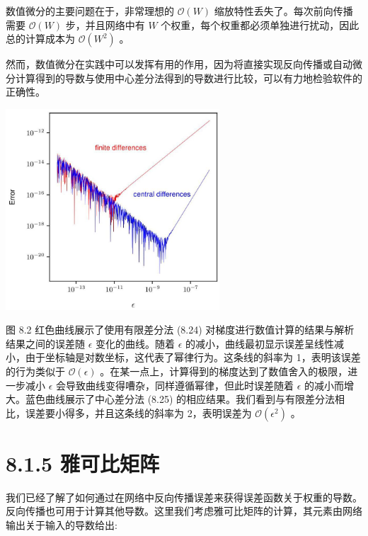 \documentclass[10pt]{article}
\begin{document}
数值微分的主要问题在于，非常理想的 \(\mathcal{O}\left( W\right)\) 缩放特性丢失了。每次前向传播需要 \(\mathcal{O}\left( W\right)\) 步，并且网络中有 \(W\) 个权重，每个权重都必须单独进行扰动，因此总的计算成本为 \(\mathcal{O}\left( {W}^{2}\right)\) 。

然而，数值微分在实践中可以发挥有用的作用，因为将直接实现反向传播或自动微分计算得到的导数与使用中心差分法得到的导数进行比较，可以有力地检验软件的正确性。

\begin{center}
\includegraphics[max width=0.6\textwidth]{images/0194e279-9b28-703a-88f4-c3ac21e2010d_259_732_344_821_770_0.jpg}
\end{center}
\hspace*{3em} 

图 8.2 红色曲线展示了使用有限差分法 (8.24) 对梯度进行数值计算的结果与解析结果之间的误差随 \(\epsilon\) 变化的曲线。随着 \(\epsilon\) 的减小，曲线最初显示误差呈线性减小，由于坐标轴是对数坐标，这代表了幂律行为。这条线的斜率为 1，表明该误差的行为类似于 \(\mathcal{O}\left( \epsilon \right)\) 。在某一点上，计算得到的梯度达到了数值舍入的极限，进一步减小 \(\epsilon\) 会导致曲线变得嘈杂，同样遵循幂律，但此时误差随着 \(\epsilon\) 的减小而增大。蓝色曲线展示了中心差分法 (8.25) 的相应结果。我们看到与有限差分法相比，误差要小得多，并且这条线的斜率为 2，表明误差为 \(\mathcal{O}\left( {\epsilon }^{2}\right)\) 。

\section*{8.1.5 雅可比矩阵}

我们已经了解了如何通过在网络中反向传播误差来获得误差函数关于权重的导数。反向传播也可用于计算其他导数。这里我们考虑雅可比矩阵的计算，其元素由网络输出关于输入的导数给出:
\end{document}
